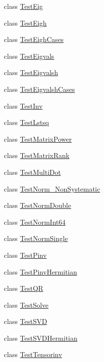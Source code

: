 \begin{DoxyCompactItemize}
class \hyperlink{classnumpy_1_1linalg_1_1tests_1_1test__linalg_1_1TestEig}{Test\+Eig}
\item 
class \hyperlink{classnumpy_1_1linalg_1_1tests_1_1test__linalg_1_1TestEigh}{Test\+Eigh}
\item 
class \hyperlink{classnumpy_1_1linalg_1_1tests_1_1test__linalg_1_1TestEighCases}{Test\+Eigh\+Cases}
\item 
class \hyperlink{classnumpy_1_1linalg_1_1tests_1_1test__linalg_1_1TestEigvals}{Test\+Eigvals}
\item 
class \hyperlink{classnumpy_1_1linalg_1_1tests_1_1test__linalg_1_1TestEigvalsh}{Test\+Eigvalsh}
\item 
class \hyperlink{classnumpy_1_1linalg_1_1tests_1_1test__linalg_1_1TestEigvalshCases}{Test\+Eigvalsh\+Cases}
\item 
class \hyperlink{classnumpy_1_1linalg_1_1tests_1_1test__linalg_1_1TestInv}{Test\+Inv}
\item 
class \hyperlink{classnumpy_1_1linalg_1_1tests_1_1test__linalg_1_1TestLstsq}{Test\+Lstsq}
\item 
class \hyperlink{classnumpy_1_1linalg_1_1tests_1_1test__linalg_1_1TestMatrixPower}{Test\+Matrix\+Power}
\item 
class \hyperlink{classnumpy_1_1linalg_1_1tests_1_1test__linalg_1_1TestMatrixRank}{Test\+Matrix\+Rank}
\item 
class \hyperlink{classnumpy_1_1linalg_1_1tests_1_1test__linalg_1_1TestMultiDot}{Test\+Multi\+Dot}
\item 
class \hyperlink{classnumpy_1_1linalg_1_1tests_1_1test__linalg_1_1TestNorm__NonSystematic}{Test\+Norm\+\_\+\+Non\+Systematic}
\item 
class \hyperlink{classnumpy_1_1linalg_1_1tests_1_1test__linalg_1_1TestNormDouble}{Test\+Norm\+Double}
\item 
class \hyperlink{classnumpy_1_1linalg_1_1tests_1_1test__linalg_1_1TestNormInt64}{Test\+Norm\+Int64}
\item 
class \hyperlink{classnumpy_1_1linalg_1_1tests_1_1test__linalg_1_1TestNormSingle}{Test\+Norm\+Single}
\item 
class \hyperlink{classnumpy_1_1linalg_1_1tests_1_1test__linalg_1_1TestPinv}{Test\+Pinv}
\item 
class \hyperlink{classnumpy_1_1linalg_1_1tests_1_1test__linalg_1_1TestPinvHermitian}{Test\+Pinv\+Hermitian}
\item 
class \hyperlink{classnumpy_1_1linalg_1_1tests_1_1test__linalg_1_1TestQR}{Test\+QR}
\item 
class \hyperlink{classnumpy_1_1linalg_1_1tests_1_1test__linalg_1_1TestSolve}{Test\+Solve}
\item 
class \hyperlink{classnumpy_1_1linalg_1_1tests_1_1test__linalg_1_1TestSVD}{Test\+S\+VD}
\item 
class \hyperlink{classnumpy_1_1linalg_1_1tests_1_1test__linalg_1_1TestSVDHermitian}{Test\+S\+V\+D\+Hermitian}
\item 
class \hyperlink{classnumpy_1_1linalg_1_1tests_1_1test__linalg_1_1TestTensorinv}{Test\+Tensorinv}
\end{DoxyCompactItemize}
